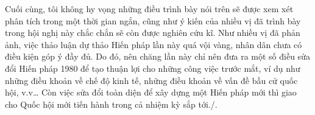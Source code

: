 Cuối cùng, tôi không hy vọng những điều trình bày nói trên sẽ được xem xét phân tích trong một thời gian ngắn, cũng như ý kiến của nhiều vị đã trình bày trong hội nghị này chắc chắn sẽ còn được nghiên cứu kĩ. Như nhiều vị đã phản ảnh, việc thảo luận dự thảo Hiến pháp lần này quá vội vàng, nhân dân chưa có điều kiện góp ý đầy đủ. Do đó, nên chăng lần này chỉ nên đưa ra một số điều sửa đổi Hiến pháp 1980 để tạo thuận lợi cho những công việc trước mắt, ví dụ như những điều khoản về chế độ kinh tế, những điều khoản về vấn đề bầu cử quốc hội, v.v… Còn việc sửa đổi toàn diện để xây dựng một Hiến pháp mới thì giao cho Quốc hội mới tiến hành trong cả nhiệm kỳ sắp tới./.